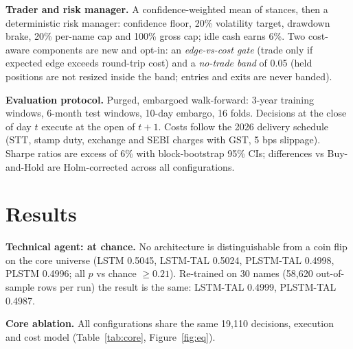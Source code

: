 \documentclass[10pt,a4paper]{article}
\begin{document}
\textbf{Trader and risk manager.} A confidence-weighted mean of stances, then a deterministic risk manager: confidence floor, 20\% volatility target, drawdown brake, 20\% per-name cap and 100\% gross cap; idle cash earns 6\%. Two cost-aware components are new and opt-in: an \emph{edge-vs-cost gate} (trade only if expected edge exceeds round-trip cost) and a \emph{no-trade band} of 0.05 (held positions are not resized inside the band; entries and exits are never banded).

\textbf{Evaluation protocol.} Purged, embargoed walk-forward: 3-year training windows, 6-month test windows, 10-day embargo, 16 folds. Decisions at the close of day $t$ execute at the open of $t+1$. Costs follow the 2026 delivery schedule (STT, stamp duty, exchange and SEBI charges with GST, 5 bps slippage). Sharpe ratios are excess of 6\% with block-bootstrap 95\% CIs; differences vs Buy-and-Hold are Holm-corrected across all configurations.

\section{Results}
\textbf{Technical agent: at chance.} No architecture is distinguishable from a coin flip on the core universe (LSTM 0.5045, LSTM-TAL 0.5024, PLSTM-TAL 0.4998, PLSTM 0.4996; all $p$ vs chance $\geq 0.21$). Re-trained on 30 names (58,620 out-of-sample rows per run) the result is the same: LSTM-TAL 0.4999, PLSTM-TAL 0.4987.

\textbf{Core ablation.} All configurations share the same 19,110 decisions, execution and cost model (Table~\ref{tab:core}, Figure~\ref{fig:eq}).
\end{document}
